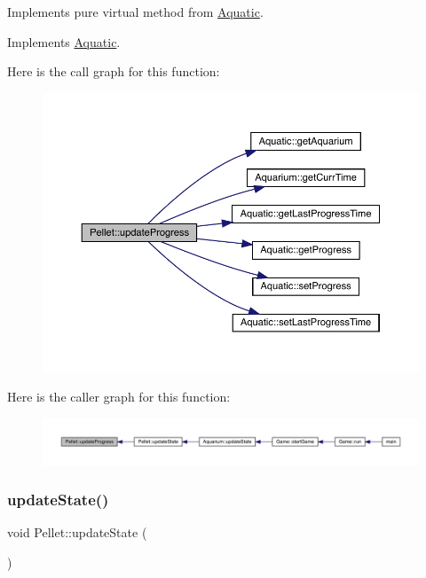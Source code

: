 Implements pure virtual method from \mbox{\hyperlink{class_aquatic}{Aquatic}}. 



Implements \mbox{\hyperlink{class_aquatic_ae1b6301ed27d6aadb73c7ee7879c24af}{Aquatic}}.

Here is the call graph for this function\+:\nopagebreak
\begin{figure}[H]
\begin{center}
\leavevmode
\includegraphics[width=350pt]{class_pellet_a1a7203cff52c771eb8cc62a91620e3ca_cgraph}
\end{center}
\end{figure}
Here is the caller graph for this function\+:\nopagebreak
\begin{figure}[H]
\begin{center}
\leavevmode
\includegraphics[width=350pt]{class_pellet_a1a7203cff52c771eb8cc62a91620e3ca_icgraph}
\end{center}
\end{figure}
\mbox{\label{class_pellet_ab21f88899eba022e1693d911eba9dbfb}} 
\subsubsection{\texorpdfstring{update\+State()}{updateState()}}
{\footnotesize\ttfamily void Pellet\+::update\+State (\begin{DoxyParamCaption}{ }\end{DoxyParamCaption})\hspace{0.3cm}{\ttfamily [virtual]}}




